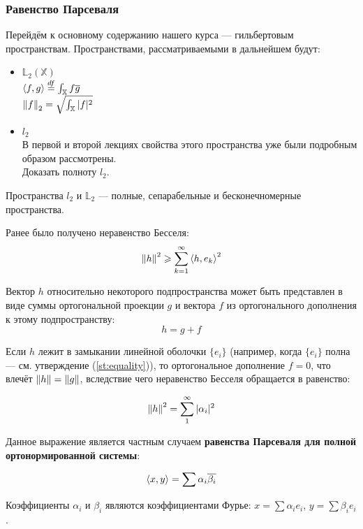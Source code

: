 \documentclass[12pt]{article}
\begin{document}
		\subsubsection{Равенство Парсеваля}


			Перейдём к основному содержанию нашего курса --- гильбертовым пространствам. Пространствами,
			рассматриваемыми в дальнейшем будут:

			\begin{itemize}
				\item $\mathbb{L}_2(\mathbb{X})$ \\
				$\left\langle f, g \right\rangle \overset{df}{=} \int_{\mathbb{X}} f\overline{g}$ \\
				$\left\| f \right\|_2 = \sqrt{\int_{\mathbb{X}} |f|^2}$ \\

				\item $l_2$ \\
				В первой и второй лекциях свойства этого пространства уже были подробным образом рассмотрены. \\
				\exc Доказать полноту $l_2$.
			\end{itemize}

			Пространства $l_2$ и $\mathbb{L}_2$ --- полные, сепарабельные и бесконечномерные пространства.

			Ранее было получено неравенство Бесселя:
			$$\left\| h \right\|^2 \geqslant \sum_{k=1}^{\infty}\left\langle h, e_k \right\rangle^2$$
			
			Вектор $h$ относительно некоторого подпространства может быть представлен в виде суммы
			ортогональной проекции $g$ и вектора $f$ из ортогонального дополнения к этому подпространству:
			$$h = g + f$$

			Если $h$ лежит в замыкании линейной оболочки $\{ e_i \}$ (например, когда $\{ e_i \}$ полна --- см. утверждение (\ref{st:equality})), то ортогональное дополнение $f = 0$, что влечёт $\left\| h \right\| = \left\| g \right\|$, вследствие чего неравенство Бесселя обращается в равенство:

			$$\left\| h \right\|^2 = \sum_1^{\infty} |\alpha_i|^2$$

			Данное выражение является частным случаем \textbf{равенства Парсеваля для полной ортонормированной системы}:

			$$ \left\langle x, y \right\rangle = \sum \alpha_i \overline{\beta_i} $$

			Коэффициенты $\alpha_i$ и $\beta_i$ являются коэффициентами Фурье: $x = \sum \alpha_i e_i$, $y = \sum \beta_i e_i$.
\end{document}
